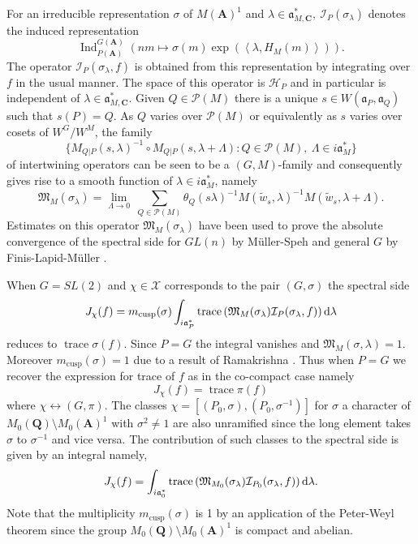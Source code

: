 \documentclass{ims9x6}
\def\A{\mathbf A}
\def\C{\mathbf C}
\def\Q{\mathbf Q}
\def\HHH{\mathcal H}
\def\III{\mathcal I}
\def\MMM{\mathfrak M}	%
\def\PPP{\mathcal P}
\def\XXX{\mathcal X}
\def\aaa{\mathfrak a}
\def\d{\text d}
\def\bs{\setminus}
\def\Ind{\operatorname{Ind}}
\def\sprod#1#2{\left\langle #1 , #2 \right\rangle}  %
\def\trace{\operatorname{trace}}
\begin{document}
For an irreducible representation $\sigma$ of $M(\A)^1$ and $\lambda \in \aaa_{M, \C}^*, \ \III_P(\sigma_\lambda)$ denotes the induced representation
\[ \Ind_{P(\A)}^{G(\A)} \left( nm \mapsto \sigma(m) \exp(\sprod{\lambda}{H_M(m)}) \right). \]
The operator $\III_P(\sigma_\lambda, f)$ is obtained from this representation by integrating over $f$ in the usual manner. The space of this operator is $\HHH_P$ and in particular is independent of $\lambda \in \aaa_{M, \C}^*$. Given $Q \in \PPP(M)$ there is a unique $s \in W(\aaa_P, \aaa_Q)$ such that $s(P) = Q$. As $Q$ varies over $\PPP(M)$ or equivalently as $s$ varies over cosets of $W^G/W^M$, the family
\[ \{ M_{Q|P}(s, \lambda)^{-1} \circ M_{Q|P}(s, \lambda + \Lambda) : Q \in \PPP(M), \ \Lambda \in i\aaa_M^* \} \]
of intertwining operators can be seen to be a $(G, M)$-family and consequently gives rise to a smooth function of $\lambda \in i\aaa_M^*$, namely
\[ \MMM_M(\sigma_\lambda) = \lim_{\Lambda \to 0} \ \sum_{Q \in \PPP(M)} \theta_Q(s\lambda)^{-1} M(\tilde w_s, \lambda)^{-1} M(\tilde w_s, \lambda + \Lambda). \]
Estimates on this operator $\MMM_M(\sigma_\lambda)$ have been used to prove the absolute convergence of the spectral side for $GL(n)$ by M{\"u}ller-Speh \cite{MS} and general $G$ by Finis-Lapid-M{\"u}ller \cite{FLM}.

When $G = SL(2)$ and $\chi \in \XXX$ corresponds to the pair $(G, \sigma)$ the spectral side
\[ J_\chi(f) = m_{\text{cusp}}(\sigma) \int_{i\aaa_P^*} \trace\left(\MMM_M(\sigma_\lambda) \III_P(\sigma_\lambda, f)\right) \d \lambda \]
reduces to $\trace \sigma(f)$. Since $P=G$ the integral vanishes and $\MMM_M(\sigma, \lambda) = 1$. Moreover $m_\text{cusp} (\sigma) = 1$ due to a result of Ramakrishna \cite{MR1792292}. Thus when $P=G$ we recover the expression for trace of $f$ as in the co-compact case namely
\[ J_\chi(f) = \trace \pi(f) \]
where $\chi \leftrightarrow (G, \pi)$. The classes $\chi = [(P_0, \sigma), (P_0, \sigma^{-1})]$ for $\sigma$ a character of $M_0(\Q) \bs M_0(\A)^1$ with $\sigma^2 \neq 1$ are also unramified since the long element takes $\sigma$ to $\sigma^{-1}$ and vice versa. The contribution of such classes to the spectral side is given by an integral namely,
\[ J_\chi(f) = \int_{i\aaa_0^*} \trace\left( \MMM_{M_0}(\sigma_\lambda) \III_{P_0}(\sigma_\lambda, f) \right) \d \lambda. \]
Note that the multiplicity $m_{\text{cusp}}(\sigma)$ is 1 by an application of the Peter-Weyl theorem since the group $M_0(\Q)\bs M_0(\A)^1$ is compact and abelian. 
\end{document}
